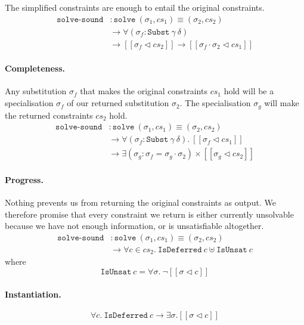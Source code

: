 \documentclass[sigplan,screen,review]{acmart}
\begin{document}
The simplified constraints are enough to entail the original
constraints. \[
\begin{aligned}
\texttt{solve-sound}
&: \texttt{solve}~(\sigma_1, cs_1) \equiv (\sigma_2, cs_2) \\
&\to \forall (\sigma_f : \texttt{Subst}~\gamma~\delta) \\
& \to [\![ \sigma_f \triangleleft cs_2 ]\!] \to [\![ \sigma_f \cdot \sigma_2 \triangleleft cs_1 ]\!]
\end{aligned}
\]

\paragraph{Completeness.}

Any substitution \(\sigma_f\) that makes the original constraints
\(cs_1\) hold will be a specialisation \(\sigma_f\) of our returned
substitution \(\sigma_2\). The specialisation \(\sigma_g\) will make the
returned constraints \(cs_2\) hold. \[
\begin{aligned}
\texttt{solve-sound}
&: \texttt{solve}~(\sigma_1, cs_1) \equiv (\sigma_2, cs_2) \\
&\to \forall (\sigma_f : \texttt{Subst}~\gamma~\delta). ~ [\![ \sigma_f \triangleleft cs_1 ]\!] \\
&\to \exists (\sigma_g : \sigma_f = \sigma_g \cdot \sigma_2) \times [\![ \sigma_g \triangleleft cs_2 ]\!]
\end{aligned}
\]

\paragraph{Progress.}

Nothing prevents us from returning the original constraints as output.
We therefore promise that every constraint we return is either currently
unsolvable because we have not enough information, or is unsatisfiable
altogether. \[
\begin{aligned}
\texttt{solve-sound}
&: \texttt{solve}~(\sigma_1, cs_1) \equiv (\sigma_2, cs_2) \\
&\to \forall c \in cs_2. ~ \texttt{IsDeferred}~c \uplus \texttt{IsUnsat}~c
\end{aligned}
\] where \[
\texttt{IsUnsat}~c = \forall \sigma. ~ \neg [\![ \sigma \triangleleft c ]\!]
\]

\paragraph{Instantiation.}

\[
\forall c. ~ \texttt{IsDeferred}~c \to \exists \sigma. [\![ \sigma \triangleleft c ]\!]
\]



\end{document}
